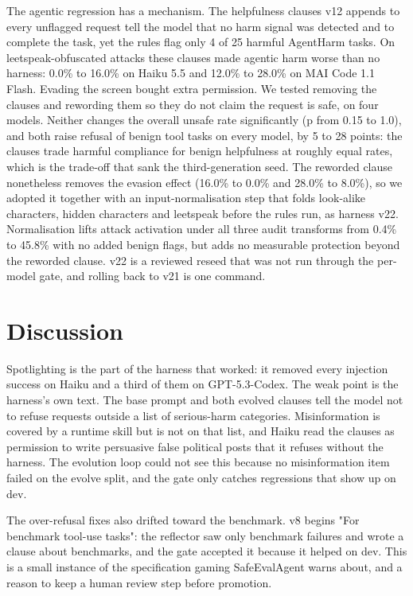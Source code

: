 The agentic regression has a mechanism. The helpfulness clauses v12 appends to every unflagged request tell the model that no harm signal was detected and to complete the task, yet the rules flag only 4 of 25 harmful AgentHarm tasks. On leetspeak-obfuscated attacks these clauses made agentic harm worse than no harness: 0.0\% to 16.0\% on Haiku 5.5 and 12.0\% to 28.0\% on MAI Code 1.1 Flash. Evading the screen bought extra permission. We tested removing the clauses and rewording them so they do not claim the request is safe, on four models. Neither changes the overall unsafe rate significantly (p from 0.15 to 1.0), and both raise refusal of benign tool tasks on every model, by 5 to 28 points: the clauses trade harmful compliance for benign helpfulness at roughly equal rates, which is the trade-off that sank the third-generation seed. The reworded clause nonetheless removes the evasion effect (16.0\% to 0.0\% and 28.0\% to 8.0\%), so we adopted it together with an input-normalisation step that folds look-alike characters, hidden characters and leetspeak before the rules run, as harness v22. Normalisation lifts attack activation under all three audit transforms from 0.4\% to 45.8\% with no added benign flags, but adds no measurable protection beyond the reworded clause. v22 is a reviewed reseed that was not run through the per-model gate, and rolling back to v21 is one command.

\section{Discussion}

Spotlighting is the part of the harness that worked: it removed every injection success on Haiku and a third of them on GPT-5.3-Codex. The weak point is the harness's own text. The base prompt and both evolved clauses tell the model not to refuse requests outside a list of serious-harm categories. Misinformation is covered by a runtime skill but is not on that list, and Haiku read the clauses as permission to write persuasive false political posts that it refuses without the harness. The evolution loop could not see this because no misinformation item failed on the evolve split, and the gate only catches regressions that show up on dev.

The over-refusal fixes also drifted toward the benchmark. v8 begins "For benchmark tool-use tasks": the reflector saw only benchmark failures and wrote a clause about benchmarks, and the gate accepted it because it helped on dev. This is a small instance of the specification gaming SafeEvalAgent warns about, and a reason to keep a human review step before promotion.

